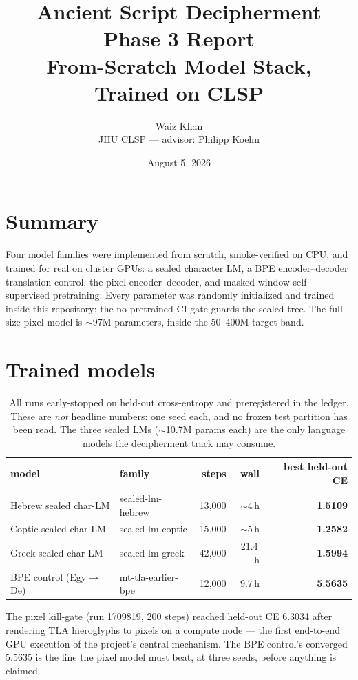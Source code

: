 \documentclass[11pt]{article}
\title{\Large Ancient Script Decipherment\\
\large Phase 3 Report\\
\normalsize From-Scratch Model Stack, Trained on CLSP}
\author{Waiz Khan\\ \small JHU CLSP --- advisor: Philipp Koehn}
\date{August 5, 2026 \quad {\small stamp: \ReportStamp}}
\begin{document}
\maketitle

\section{Summary}
Four model families were implemented from scratch, smoke-verified on CPU, and
trained for real on cluster GPUs: a sealed character LM, a BPE
encoder--decoder translation control, the pixel encoder--decoder, and
masked-window self-supervised pretraining. Every parameter was randomly
initialized and trained inside this repository; the no-pretrained CI gate
guards the sealed tree. The full-size pixel model is $\sim$97M parameters,
inside the 50--400M target band.

\section{Trained models}
\begin{table}[h]\centering\small
\begin{tabular}{llrrr}
\toprule
model & family & steps & wall & best held-out CE \\
\midrule
Hebrew sealed char-LM & sealed-lm-hebrew & 13{,}000 & $\sim$4\,h & \textbf{1.5109} \\
Coptic sealed char-LM & sealed-lm-coptic & 15{,}000 & $\sim$5\,h & \textbf{1.2582} \\
Greek sealed char-LM  & sealed-lm-greek  & 42{,}000 & 21.4\,h & \textbf{1.5994} \\
BPE control (Egy$\to$De) & mt-tla-earlier-bpe & 12{,}000 & 9.7\,h & \textbf{5.5635} \\
\bottomrule
\end{tabular}
\caption{All runs early-stopped on held-out cross-entropy and preregistered in
the ledger. These are \emph{not} headline numbers: one seed each, and no
frozen test partition has been read. The three sealed LMs ($\sim$10.7M params
each) are the only language models the decipherment track may consume.}
\end{table}

The pixel kill-gate (run 1709819, 200 steps) reached held-out CE 6.3034 after
rendering TLA hieroglyphs to pixels on a compute node --- the first end-to-end
GPU execution of the project's central mechanism. The BPE control's converged
5.5635 is the line the pixel model must beat, at three seeds, before anything
is claimed.
\end{document}
